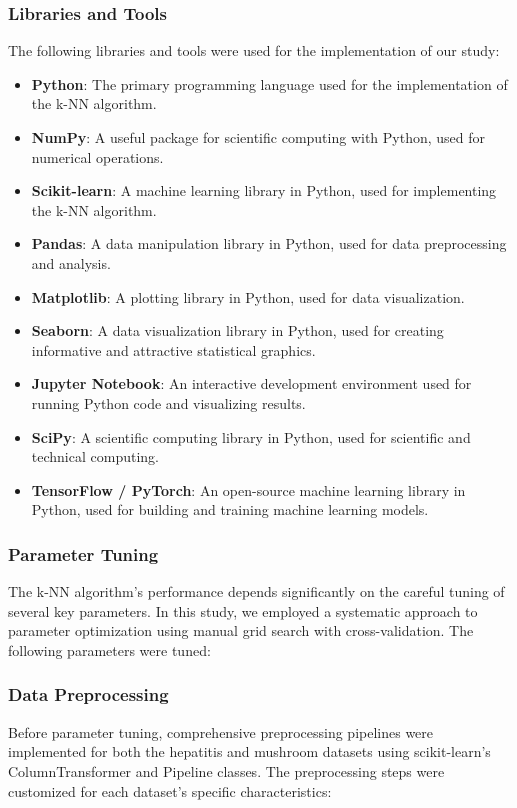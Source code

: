 \subsubsection*{Libraries and Tools}
The following libraries and tools were used for the implementation of our study:
\begin{itemize}
    \item \textbf{Python}: The primary programming language used for the implementation of the k-NN algorithm.
    \item \textbf{NumPy}: A useful package for scientific computing with Python, used for numerical operations.
    \item \textbf{Scikit-learn}: A machine learning library in Python, used for implementing the k-NN algorithm.
    \item \textbf{Pandas}: A data manipulation library in Python, used for data preprocessing and analysis.
    \item \textbf{Matplotlib}: A plotting library in Python, used for data visualization.
    \item \textbf{Seaborn}: A data visualization library in Python, used for creating informative and attractive statistical graphics.
    \item \textbf{Jupyter Notebook}: An interactive development environment used for running Python code and visualizing results.
    \item \textbf{SciPy}: A scientific computing library in Python, used for scientific and technical computing.
    \item \textbf{TensorFlow / PyTorch}: An open-source machine learning library in Python, used for building and training machine learning models.
\end{itemize}

\subsubsection{Parameter Tuning}
The k-NN algorithm's performance depends significantly on the careful tuning of several key parameters.
In this study, we employed a systematic approach to parameter optimization using manual grid search with
cross-validation. The following parameters were tuned:

\subsubsection*{Data Preprocessing}
Before parameter tuning, comprehensive preprocessing pipelines were implemented for both the hepatitis
and mushroom datasets using scikit-learn's ColumnTransformer and Pipeline classes.
The preprocessing steps were customized for each dataset's specific characteristics:


